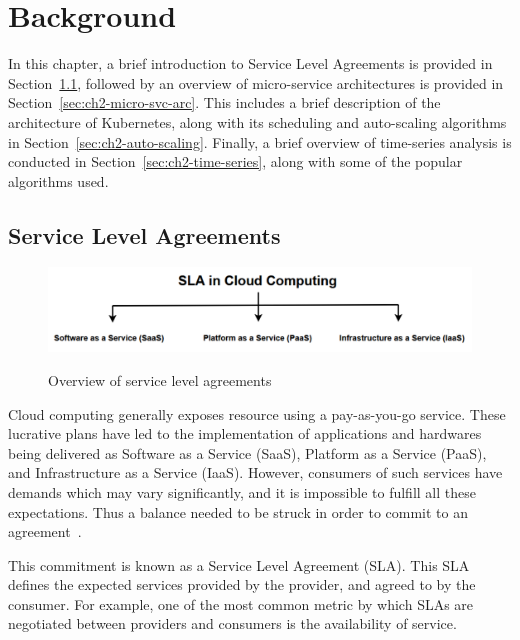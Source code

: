 \clearpage

\def\chaptertitle{Background}

\lhead{\emph{\chaptertitle}}

\chapter{\chaptertitle}
\label{ch:background}

In this chapter, a brief introduction to Service Level Agreements is provided in Section~\ref{sec:ch2-sla}, followed by an overview of micro-service architectures is provided in Section~\ref{sec:ch2-micro-svc-arc}. This includes a brief description of the architecture of Kubernetes, along with its scheduling and auto-scaling algorithms in Section~\ref{sec:ch2-auto-scaling}. Finally, a brief overview of time-series analysis is conducted in Section~\ref{sec:ch2-time-series}, along with some of the popular algorithms used.

\section{Service Level Agreements}
\label{sec:ch2-sla}

\begin{figure}[htb]
    \centering
    \caption{Overview of service level agreements}
    \includegraphics[width=0.9\linewidth]{Figures/SLA-Cloud-Computing.pdf}
    \label{fig:sla-types}
\end{figure}

Cloud computing generally exposes resource using a pay-as-you-go service. These lucrative plans have led to the implementation of applications and hardwares being delivered as Software as a Service (SaaS), Platform as a Service (PaaS), and Infrastructure as a Service (IaaS). However, consumers of such services have demands which may vary significantly, and it is impossible to fulfill all these expectations. Thus a balance needed to be struck in order to commit to an agreement~\cite{patel2009service}. \par
This commitment is known as a Service Level Agreement (SLA). This SLA defines the expected services provided by the provider, and agreed to by the consumer. For example, one of the most common metric by which SLAs are negotiated between providers and consumers is the availability of service.

